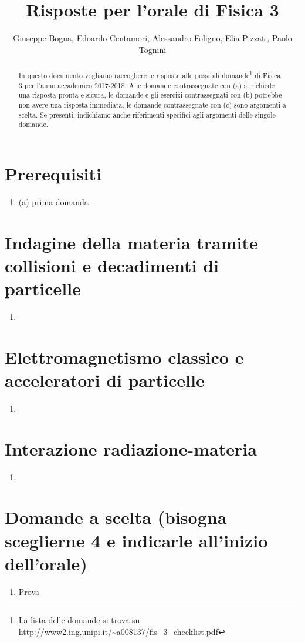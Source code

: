 \documentclass[a4paper,11pt]{article}
\title{Risposte per l'orale di Fisica 3}
\author{Giuseppe Bogna, Edoardo Centamori, Alessandro Foligno, Elia Pizzati, Paolo Tognini}
\renewcommand{\a}{(a) }
\begin{document}
	\maketitle
	\begin{abstract}
		\noindent In questo documento vogliamo raccogliere le risposte alle possibili domande\footnote{La lista delle domande si trova su \url{http://www2.ing.unipi.it/~a008137/fis_3_checklist.pdf}} di Fisica 3 per l'anno accademico 2017-2018. Alle domande contrassegnate con (a) si richiede una risposta pronta e sicura, le domande e gli esercizi contrassegnati con (b) potrebbe non avere una risposta immediata, le domande contrassegnate con (c) sono argomenti a scelta. Se presenti, indichiamo anche riferimenti specifici agli argomenti delle singole domande.
	\end{abstract}
\section{Prerequisiti}
	\begin{enumerate}
		\item \a prima domanda
	\end{enumerate}
\section{Indagine della materia tramite collisioni e decadimenti di particelle}
	\begin{enumerate}
		\item 
	\end{enumerate}
\section{Elettromagnetismo classico e acceleratori di particelle}
	\begin{enumerate}
		\item 
	\end{enumerate}
\section{Interazione radiazione-materia}
	\begin{enumerate}
		\item 
	\end{enumerate}
\section{Domande a scelta (bisogna sceglierne 4 e indicarle all'inizio dell'orale)}
	\begin{enumerate}
		\item Prova
	\end{enumerate}
\end{document}
